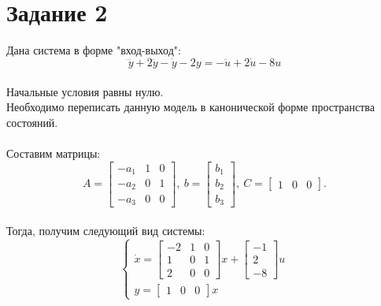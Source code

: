 \documentclass[12pt]{article}
\begin{document}
\section*{Задание 2}
Дана система в форме "вход-выход":
\[
\dddot{y} + 2\ddot{y} - \dot{y} - 2y = -\ddot{u} + 2\dot{u} - 8u
\]\\
Начальные условия равны нулю.\\
Необходимо переписать данную модель в канонической форме пространства состояний.\\
\ \\
Составим матрицы:
\[
A=\begin{bmatrix}
-a_1 & 1 & 0\\
-a_2 & 0 & 1\\
-a_3 & 0 & 0
\end{bmatrix},\
b=\begin{bmatrix}
    b_1\\
    b_2\\
    b_3
\end{bmatrix},\
C = \begin{bmatrix}
    1 & 0 & 0
\end{bmatrix}.
\] \\
Тогда, получим следующий вид системы:
\[
\begin{cases}
    \dot{x}=\begin{bmatrix}
-2 & 1 & 0\\
1 & 0 & 1\\
2 & 0 & 0
\end{bmatrix}x+\begin{bmatrix}
    -1\\
    2\\
    -8
\end{bmatrix}u\\
    y=\begin{bmatrix}
    1 & 0 & 0
\end{bmatrix}x
\end{cases}
\]
\end{document}

